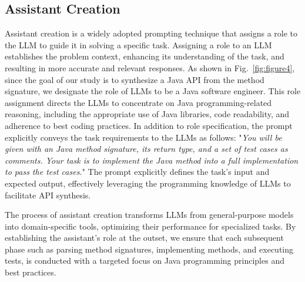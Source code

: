 \subsection{Assistant Creation}
\label{sec:sec31}
Assistant creation is a widely adopted prompting technique that assigns a role to the LLM to guide it in solving a specific task. Assigning a role to an LLM establishes the problem context, enhancing its understanding of the task, and resulting in more accurate and relevant responses. As shown in Fig.~\ref{fig:figure4}, since the goal of our study is to synthesize a Java API from the method signature, we designate the role of LLMs to be a Java software engineer. This role assignment directs the LLMs to concentrate on Java programming-related reasoning, including the appropriate use of Java libraries, code readability, and adherence to best coding practices. In addition to role specification, the prompt explicitly conveys the task requirements to the LLMs as follows: "\textit{You will be given with an Java method signature, its return type, and a set of test cases as comments. Your task is to implement the Java method into a full implementation to pass the test cases.}" The prompt explicitly defines the task's input and expected output, effectively leveraging the programming knowledge of LLMs to facilitate API synthesis.

The process of assistant creation transforms LLMs from general-purpose models into domain-specific tools, optimizing their performance for specialized tasks. By establishing the assistant's role at the outset, we ensure that each subsequent phase such as parsing method signatures, implementing methods, and executing tests, is conducted with a targeted focus on Java programming principles and best practices.


